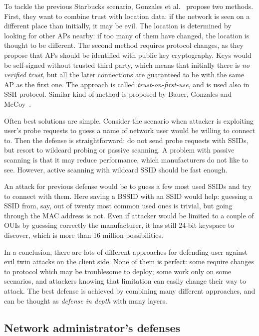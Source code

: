 \documentclass[12pt,a4paper,oneside,pdftex]{report}
\begin{document}
To tackle the previous Starbucks scenario, Gonzales et al.~\cite{gonzales2010practical} propose two methods. First, they want to combine trust with location data: if the network is seen on a different place than initially, it may be evil. The location is determined by looking for other APs nearby: if too many of them have changed, the location is thought to be different. The second method requires protocol changes, as they propose that APs should be identified with public key cryptography. Keys would be self-signed without trusted third party, which means that initially there is \emph{no verified trust}, but all the later connections are guaranteed to be with the same AP as the first one. The approach is called \emph{trust-on-first-use}, and is used also in SSH protocol. Similar kind of method is proposed by Bauer, Gonzales and McCoy~\cite{bauer2008mitigating}.

Often best solutions are simple. Consider the scenario when attacker is exploiting user's probe requests to guess a name of network user would be willing to connect to. Then the defense is straightforward: do not send probe requests with SSIDs, but resort to wildcard probing or passive scanning. A problem with passive scanning is that it may reduce performance, which manufacturers do not like to see. However, active scanning with wildcard SSID should be fast enough.

An attack for previous defense would be to guess a few most used SSIDs and try to connect with them. Here saving a BSSID with an SSID would help: guessing a SSID from, say, out of twenty most common used ones is trivial, but going through the MAC address is not. Even if attacker would be limited to a couple of OUIs by guessing correctly the manufacturer, it has still 24-bit keyspace to discover, which is more than 16 million possibilities.

In a conclusion, there are lots of different approaches for defending user against evil twin attacks on the client side. None of them is perfect: some require changes to protocol which may be troublesome to deploy; some work only on some scenarios, and attackers knowing that limitation can easily change their way to attack. The best defense is achieved by combining many different approaches, and can be thought as \emph{defense in depth} with many layers.

\subsection{Network administrator's defenses}
\end{document}
